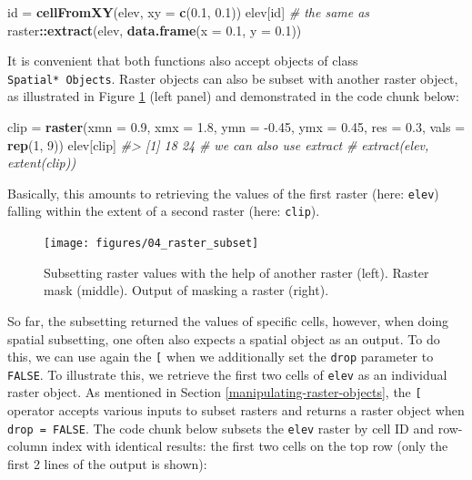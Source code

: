 \documentclass[]{krantz}
\newenvironment{Shaded}{\begin{snugshade}}{\end{snugshade}}
\newcommand{\CommentTok}[1]{\textcolor[rgb]{0.37,0.37,0.37}{\textit{#1}}}
\newcommand{\DataTypeTok}[1]{\textcolor[rgb]{0.27,0.27,0.27}{#1}}
\newcommand{\DecValTok}[1]{\textcolor[rgb]{0.06,0.06,0.06}{#1}}
\newcommand{\FloatTok}[1]{\textcolor[rgb]{0.06,0.06,0.06}{#1}}
\newcommand{\KeywordTok}[1]{\textcolor[rgb]{0.27,0.27,0.27}{\textbf{#1}}}
\newcommand{\NormalTok}[1]{#1}
\newcommand{\OperatorTok}[1]{\textcolor[rgb]{0.43,0.43,0.43}{\textbf{#1}}}
\newcommand{\StringTok}[1]{\textcolor[rgb]{0.5,0.5,0.5}{#1}}
\begin{document}
\begin{Shaded}
\begin{Highlighting}[]
\NormalTok{id =}\StringTok{ }\KeywordTok{cellFromXY}\NormalTok{(elev, }\DataTypeTok{xy =} \KeywordTok{c}\NormalTok{(}\FloatTok{0.1}\NormalTok{, }\FloatTok{0.1}\NormalTok{))}
\NormalTok{elev[id]}
\CommentTok{# the same as}
\NormalTok{raster}\OperatorTok{::}\KeywordTok{extract}\NormalTok{(elev, }\KeywordTok{data.frame}\NormalTok{(}\DataTypeTok{x =} \FloatTok{0.1}\NormalTok{, }\DataTypeTok{y =} \FloatTok{0.1}\NormalTok{))}
\end{Highlighting}
\end{Shaded}

It is convenient that both functions also accept objects of class \texttt{Spatial*\ Objects}.
Raster objects can also be subset with another raster object, as illustrated in Figure \ref{fig:raster-subset} (left panel) and demonstrated in the code chunk below:

\begin{Shaded}
\begin{Highlighting}[]
\NormalTok{clip =}\StringTok{ }\KeywordTok{raster}\NormalTok{(}\DataTypeTok{xmn =} \FloatTok{0.9}\NormalTok{, }\DataTypeTok{xmx =} \FloatTok{1.8}\NormalTok{, }\DataTypeTok{ymn =} \FloatTok{-0.45}\NormalTok{, }\DataTypeTok{ymx =} \FloatTok{0.45}\NormalTok{,}
              \DataTypeTok{res =} \FloatTok{0.3}\NormalTok{, }\DataTypeTok{vals =} \KeywordTok{rep}\NormalTok{(}\DecValTok{1}\NormalTok{, }\DecValTok{9}\NormalTok{))}
\NormalTok{elev[clip]}
\CommentTok{#> [1] 18 24}
\CommentTok{# we can also use extract}
\CommentTok{# extract(elev, extent(clip))}
\end{Highlighting}
\end{Shaded}

Basically, this amounts to retrieving the values of the first raster (here: \texttt{elev}) falling within the extent of a second raster (here: \texttt{clip}).

\begin{figure}[t]

{\centering \texttt{[image: figures/04\_raster\_subset]} 

}

\caption[Subsetting raster values.]{Subsetting raster values with the help of another raster (left). Raster mask (middle). Output of masking a raster (right).}\label{fig:raster-subset}
\end{figure}

So far, the subsetting returned the values of specific cells, however, when doing spatial subsetting, one often also expects a spatial object as an output.
To do this, we can use again the \texttt{{[}} when we additionally set the \texttt{drop} parameter to \texttt{FALSE}.
To illustrate this, we retrieve the first two cells of \texttt{elev} as an individual raster object.
As mentioned in Section \ref{manipulating-raster-objects}, the \texttt{{[}} operator accepts various inputs to subset rasters and returns a raster object when \texttt{drop\ =\ FALSE}.
The code chunk below subsets the \texttt{elev} raster by cell ID and row-column index with identical results: the first two cells on the top row (only the first 2 lines of the output is shown):
\end{document}
